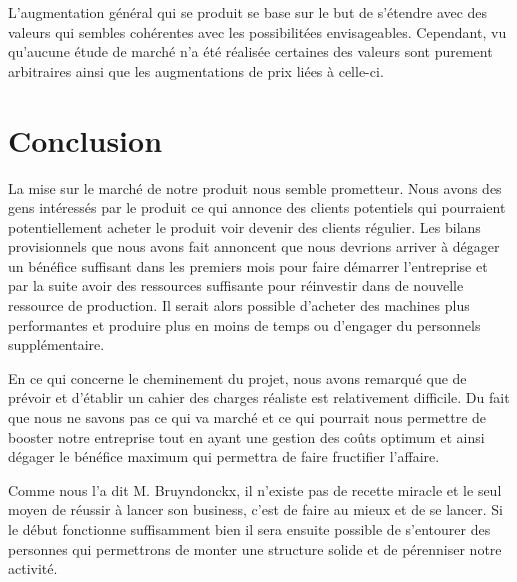 \documentclass[12pt]{article}
\begin{document}
L'augmentation général qui se produit se base sur le but de s'étendre avec des valeurs qui sembles cohérentes avec les possibilitées envisageables. Cependant, vu qu'aucune étude de marché n'a été réalisée certaines des valeurs sont purement arbitraires ainsi que les augmentations de prix liées à celle-ci.   

\section{Conclusion}
La mise sur le marché de notre produit nous semble prometteur. Nous avons des gens intéressés par le produit ce qui annonce des clients potentiels qui pourraient potentiellement acheter le produit voir devenir des clients régulier. Les bilans provisionnels que nous avons fait annoncent que nous devrions arriver à dégager un bénéfice suffisant dans les premiers mois pour faire démarrer l'entreprise et par la suite avoir des ressources suffisante pour réinvestir dans de nouvelle ressource de production. Il serait alors possible d'acheter des machines plus performantes et produire plus en moins de temps ou d'engager du personnels supplémentaire.

En ce qui concerne le cheminement du projet, nous avons remarqué que de prévoir et d'établir un cahier des charges réaliste est relativement difficile. Du fait que nous ne savons pas ce qui va marché et ce qui pourrait nous permettre de booster notre entreprise tout en ayant une gestion des coûts optimum et ainsi dégager le bénéfice maximum qui permettra de faire fructifier l'affaire.

Comme nous l'a dit M. Bruyndonckx, il n'existe pas de recette miracle et le seul moyen de réussir à lancer son business, c'est de faire au mieux et de se lancer. Si le début fonctionne suffisamment bien il sera ensuite possible de s'entourer des personnes qui permettrons de monter une structure solide et de pérenniser notre activité.



\end{document}
